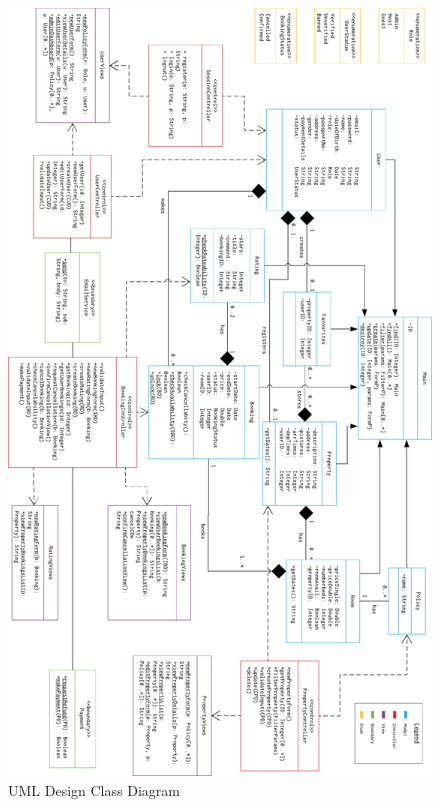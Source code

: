 \begin{figure}[H]
    \centering
    \includegraphics[width=14cm]{img/design_diagram_h.png}
    \caption{UML Design Class Diagram}
    \label{design_diagram}
\end{figure}

